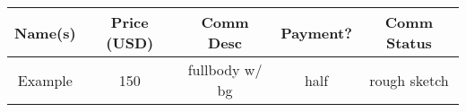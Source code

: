 \documentclass{article}
\newcommand{\vcs}{\vphantom{$\dspt \frac{a^-}{b}$}}
\newcommand{\hcs}{\hphantom{aaaaa}}
\newcommand{\dspt}{\displaystyle}
\begin{document}
\begin{center}
	\begin{tabular}{|c|c|c|c|c|}
		\hline
		\vcs\hcs\hcs\textbf{Name(s)}\hcs\hcs & \textbf{Price (USD)} & \hcs\textbf{Comm Desc}\hcs & \textbf{Payment?} & \textbf{Comm Status}\\\hline
		
		\vcs Example & 150 & fullbody w/ bg & half & rough sketch\\\hline
		
	\end{tabular}
\end{center}
\end{document}
